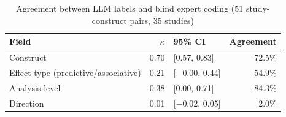 \begin{table}[htbp]
\centering
\footnotesize
\caption{Agreement between LLM labels and blind expert coding (51 study-construct pairs, 35 studies)}
\label{tab:C4}
\begin{tabular}{lrlr}
\toprule
Field & $\kappa$ & 95\% CI & Agreement \\
\midrule
Construct & 0.70 & [0.57, 0.83] & 72.5\% \\
Effect type (predictive/associative) & 0.21 & [$-$0.00, 0.44] & 54.9\% \\
Analysis level & 0.38 & [0.00, 0.71] & 84.3\% \\
Direction & 0.01 & [$-$0.02, 0.05] & 2.0\% \\
\bottomrule
\end{tabular}
\par{}
\end{table}
